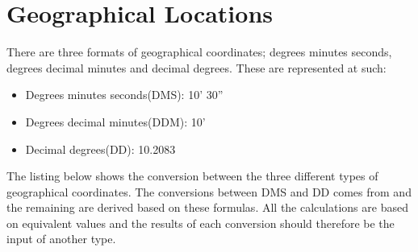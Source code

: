 \section{Geographical Locations} \label{sec:geo_coordinates}
There are three formats of geographical coordinates; degrees minutes seconds, degrees decimal minutes and decimal degrees\cite{geo_types}. These are represented at such:
\begin{itemize}
	\item Degrees minutes seconds(DMS): 10' 30''
	\item Degrees decimal minutes(DDM): 10'
	\item Decimal degrees(DD): 10.2083\degree
\end{itemize}

The listing below shows the conversion between the three different types of geographical coordinates. The conversions between DMS and DD comes from\cite{geo_converter} and the remaining are derived based on these formulas. All the calculations are based on equivalent values and the results of each conversion should therefore be the input of another type.


